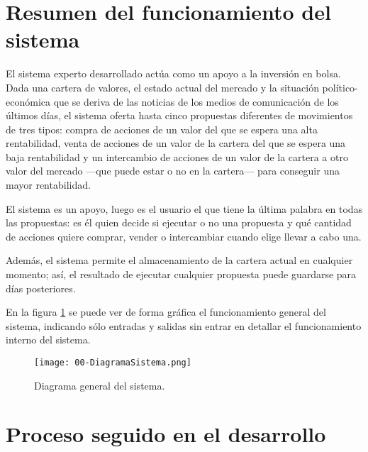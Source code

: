 \documentclass[a4paper, 11pt, titlepage]{article}
\begin{document}
    \maketitle

    \tableofcontents
    \newpage


    \section{Resumen del funcionamiento del sistema}

    El sistema experto desarrollado actúa como un apoyo a la inversión en bolsa. Dada una cartera de valores, el estado actual del mercado y la situación político-económica que se deriva de las noticias de los medios de comunicación de los últimos días, el sistema oferta hasta cinco propuestas diferentes de movimientos de tres tipos: compra de acciones de un valor del que se espera una alta rentabilidad, venta de acciones de un valor de la cartera del que se espera una baja rentabilidad y un intercambio de acciones de un valor de la cartera a otro valor del mercado ---que puede estar o no en la cartera--- para conseguir una mayor rentabilidad.

    El sistema es un apoyo, luego es el usuario el que tiene la última palabra en todas las propuestas: es él quien decide si ejecutar o no una propuesta y qué cantidad de acciones quiere comprar, vender o intercambiar cuando elige llevar a cabo una.

    Además, el sistema permite el almacenamiento de la cartera actual en cualquier momento; así, el resultado de ejecutar cualquier propuesta puede guardarse para días posteriores.

    En la figura \ref{fig:diagrama} se puede ver de forma gráfica el funcionamiento general del sistema, indicando sólo entradas y salidas sin entrar en detallar el funcionamiento interno del sistema.
    \begin{center}
        \begin{figure}[!htb]
            \centering
            \texttt{[image: 00-DiagramaSistema.png]}
            \caption{Diagrama general del sistema.}
            \label{fig:diagrama}
        \end{figure}
    \end{center}


    \section{Proceso seguido en el desarrollo}
\end{document}
